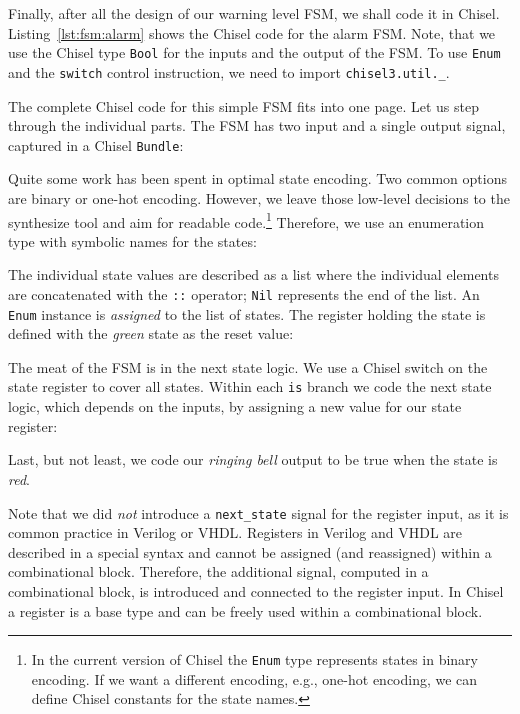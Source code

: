 \documentclass[%
    10pt,
    headinclude, footexclude,
    openright, %
    notitlepage,
    cleardoubleempty,
    headsepline,
    pointlessnumbers,
    bibtotoc, idxtotoc,
    ]{scrbook}
\newcommand{\code}[1]{{\small{\texttt{#1}}}}
\begin{document}
Finally, after all the design of our warning level FSM, we shall code it in Chisel.
Listing~\ref{lst:fsm:alarm} shows the Chisel code for the alarm FSM.
Note, that we use the Chisel type \code{Bool} for the inputs and the
output of the FSM.
To use \code{Enum} and the \code{switch} control instruction, we need to
import \code{chisel3.util.\_}.


The complete Chisel code for this simple FSM fits into one page.
Let us step through the individual parts.
The FSM has two input and a single output signal, captured in a Chisel \code{Bundle}:
%


\noindent Quite some work has been spent in optimal state encoding. Two common options
are binary or one-hot encoding. However, we leave those low-level decisions to
the synthesize tool and aim for readable code.\footnote{In the current version
of Chisel the \code{Enum} type represents states in binary encoding.
If we want a different encoding, e.g., one-hot encoding, we can define Chisel
constants for the state names.}
Therefore, we use an enumeration type with symbolic names for the states:


\noindent The individual state values are described as a list where the individual
elements are concatenated with the \code{::} operator; \code{Nil} represents
the end of the list. An \code{Enum} instance is \emph{assigned} to the list of states.
The register holding the state is defined with the \emph{green} state as the reset value:


\noindent The meat of the FSM is in the next state logic. We use a Chisel switch on the
state register to cover all states. Within each \code{is} branch we code the next state
logic, which depends on the inputs, by assigning a new value for our state register:


\noindent Last, but not least, we code our \emph{ringing bell} output to be true when
the state is \emph{red}.


Note that we did \emph{not} introduce a \code{next\_state} signal for the register input,
as it is common practice in Verilog or VHDL.
Registers in Verilog and VHDL are described in a special syntax and cannot
be assigned (and reassigned) within a combinational block.
Therefore, the additional signal, computed in a combinational block, is
introduced and connected to the register input.
In Chisel a register is a base type and can be freely used within a combinational block.
\end{document}
